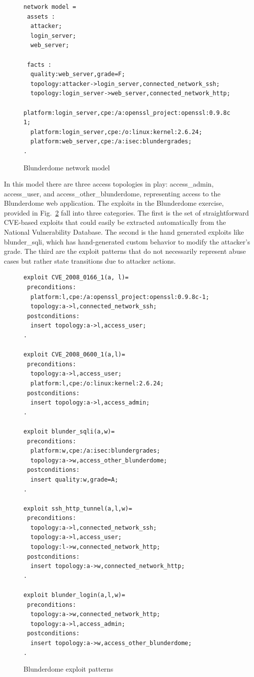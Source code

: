 \begin{figure}
\begin{lstlisting}
network model = 
 assets :
  attacker;
  login_server;
  web_server;
    
 facts :
  quality:web_server,grade=F;
  topology:attacker->login_server,connected_network_ssh;
  topology:login_server->web_server,connected_network_http;
  platform:login_server,cpe:/a:openssl_project:openssl:0.9.8c-1;
  platform:login_server,cpe:/o:linux:kernel:2.6.24;
  platform:web_server,cpe:/a:isec:blundergrades;
.
\end{lstlisting}
\caption{Blunderdome network model}
\label{fig:blunder_nm}
\end{figure}

In this model there are three access topologies in play: access_admin,
access_user, and access_other_blunderdome, representing access to the 
Blunderdome web application.
The exploits in the Blunderdome exercise, provided in Fig.~\ref{fig:blunder_xp}
fall into three categories. The first is the set of straightforward CVE-based exploits
that could easily be extracted automatically from the National Vulnerability
Database. The second is the hand generated exploits like blunder_sqli, which
has hand-generated custom behavior to modify the attacker's grade. The third
are the exploit patterns that do not necessarily represent abuse cases 
but rather state transitions due to attacker actions.

\begin{figure}
\begin{lstlisting}
exploit CVE_2008_0166_1(a, l)=
 preconditions:
  platform:l,cpe:/a:openssl_project:openssl:0.9.8c-1;
  topology:a->l,connected_network_ssh;
 postconditions:
  insert topology:a->l,access_user;
.

exploit CVE_2008_0600_1(a,l)=
 preconditions:
  topology:a->l,access_user;
  platform:l,cpe:/o:linux:kernel:2.6.24;
 postconditions:
  insert topology:a->l,access_admin;
.

exploit blunder_sqli(a,w)=
 preconditions:
  platform:w,cpe:/a:isec:blundergrades;
  topology:a->w,access_other_blunderdome;
 postconditions:
  insert quality:w,grade=A;
.

exploit ssh_http_tunnel(a,l,w)=
 preconditions:
  topology:a->l,connected_network_ssh;
  topology:a->l,access_user;
  topology:l->w,connected_network_http;
 postconditions:
  insert topology:a->w,connected_network_http;
.

exploit blunder_login(a,l,w)=
 preconditions:
  topology:a->w,connected_network_http;
  topology:a->l,access_admin;
 postconditions:
  insert topology:a->w,access_other_blunderdome;
.
\end{lstlisting}
\caption{Blunderdome exploit patterns}
\label{fig:blunder_xp}
\end{figure}

